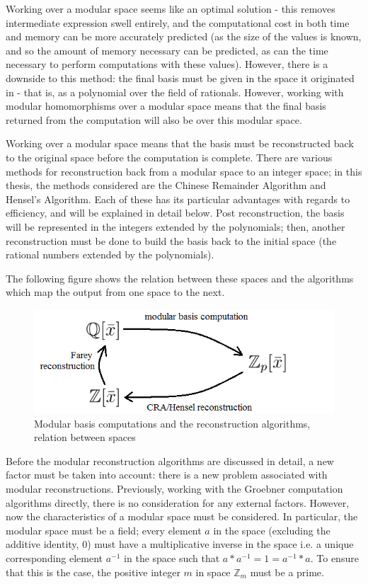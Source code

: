 \documentclass[letterpaper,12pt,titlepage,oneside,final]{book}
\begin{document}
Working over a modular space seems like an optimal solution - this removes intermediate expression swell entirely, and the computational cost in both time and memory can be more accurately predicted (as the size of the values is known, and so the amount of memory necessary can be predicted, as can the time necessary to perform computations with these values).  However, there is a downside to this method: the final basis must be given in the space it originated in - that is, as a polynomial over the field of rationals.  However, working with modular homomorphisms over a modular space means that the final basis returned from the computation will also be over this modular space.  

Working over a modular space means that the basis must be reconstructed back to the original space before the computation is complete.  There are various methods for reconstruction back from a modular space to an integer space; in this thesis, the methods considered are the Chinese Remainder Algorithm and Hensel's Algorithm.  Each of these has its particular advantages with regards to efficiency, and will be explained in detail below.  Post reconstruction, the basis will be represented in the integers extended by the polynomials; then, another reconstruction must be done to build the basis back to the initial space (the rational numbers extended by the polynomials).    

The following figure shows the relation between these spaces and the algorithms which map the output from one space to the next.

\begin{figure}[H]
  \centering
  \includegraphics[scale=0.7]{reconstructionRelations.png}
  \caption{Modular basis computations and the reconstruction algorithms, relation between spaces \label{fig:bb_tests}}
\end{figure}

Before the modular reconstruction algorithms are discussed in detail, a new factor must be taken into account: there is a new problem associated with modular reconstructions.  Previously, working with the Groebner computation algorithms directly, there is no consideration for any external factors.  However, now the characteristics of a modular space must be considered.  In particular, the modular space must be a field; every element ${a}$ in the space (excluding the additive identity, 0) must have a multiplicative inverse in the space i.e. a unique corresponding element ${a^{-1}}$ in the space such that ${a*a^{-1} = 1 = a^{-1}*a}$.  To ensure that this is the case, the positive integer ${m}$ in space ${\mathbb{Z}_m}$ must be a prime.
\end{document}
